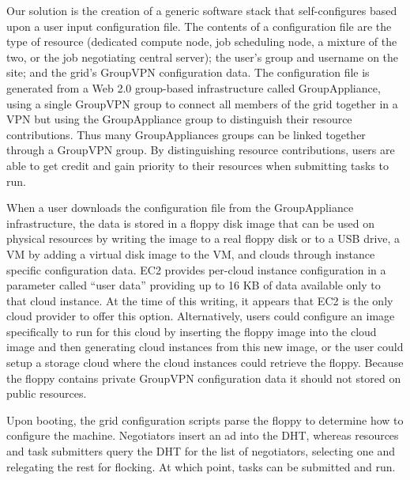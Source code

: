 Our solution is the creation of a generic software stack that self-configures
based upon a user input configuration file.  The contents of a configuration
file are the type of resource (dedicated compute node, job scheduling node, a
mixture of the two, or the job negotiating central server); the user's group and
username on the site; and the grid's GroupVPN configuration data.  The
configuration file is generated from a Web 2.0 group-based infrastructure
called GroupAppliance, using a single GroupVPN group to connect all members of
the grid together in a VPN but using the GroupAppliance group to distinguish
their resource contributions.  Thus many GroupAppliances groups can be linked
together through a GroupVPN group.  By distinguishing resource contributions,
users are able to get credit and gain priority to their resources when
submitting tasks to run.

When a user downloads the configuration file from the GroupAppliance
infrastructure, the data is stored in a floppy disk image that can be used on
physical resources by writing the image to a real floppy disk or to a USB drive,
a VM by adding a virtual disk image to the VM, and clouds through instance
specific configuration data.  EC2 provides per-cloud instance configuration in a
parameter called ``user data'' providing up to 16 KB of data available only to
that cloud instance.  At the time of this writing, it appears that EC2 is the
only cloud provider to offer this option.  Alternatively, users could configure
an image specifically to run for this cloud by inserting the floppy image into
the cloud image and then generating cloud instances from this new image, or the
user could setup a storage cloud where the cloud instances could retrieve the
floppy.  Because the floppy contains private GroupVPN configuration data it
should not stored on public resources.

Upon booting, the grid configuration scripts parse the floppy to determine how
to configure the machine.  Negotiators insert an ad into the DHT, whereas
resources and task submitters query the DHT for the list of negotiators,
selecting one and relegating the rest for flocking.  At which point, tasks
can be submitted and run.

